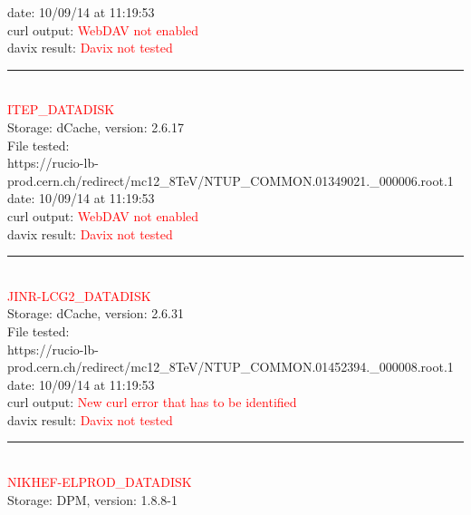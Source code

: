 date: 10/09/14 at 11:19:53\\

curl output:  \textcolor{red}{WebDAV not enabled}\\

davix result:  \textcolor{red}{Davix not tested}\\

\rule{\textwidth}{1pt}\\

\textcolor{red}{\normalsize{ITEP\_DATADISK}}\\

Storage: dCache, version: 2.6.17\\

File tested:\\
\footnotesize{https://rucio-lb-prod.cern.ch/redirect/mc12\_8TeV/NTUP\_COMMON.01349021.\_000006.root.1}\\

date: 10/09/14 at 11:19:53\\

curl output:  \textcolor{red}{WebDAV not enabled}\\

davix result:  \textcolor{red}{Davix not tested}\\

\rule{\textwidth}{1pt}\\

\textcolor{red}{\normalsize{JINR-LCG2\_DATADISK}}\\

Storage: dCache, version: 2.6.31\\

File tested:\\
\footnotesize{https://rucio-lb-prod.cern.ch/redirect/mc12\_8TeV/NTUP\_COMMON.01452394.\_000008.root.1}\\

date: 10/09/14 at 11:19:53\\

curl output:  \textcolor{red}{New curl error that has to be identified}\\

davix result:  \textcolor{red}{Davix not tested}\\

\rule{\textwidth}{1pt}\\

\textcolor{red}{\normalsize{NIKHEF-ELPROD\_DATADISK}}\\

Storage: DPM, version: 1.8.8-1\\

